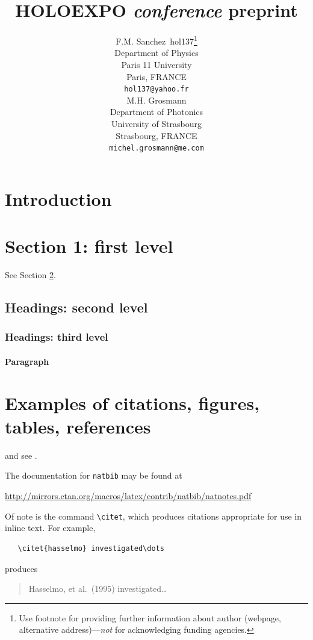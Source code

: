 \documentclass{article}
\title{HOLOEXPO \emph{conference} preprint}
\author{
  F.M. Sanchez~hol137\thanks{Use footnote for providing further
    information about author (webpage, alternative
    address)---\emph{not} for acknowledging funding agencies.} \\
  Department of Physics\\
  Paris 11 University\\
  Paris, FRANCE \\
  \texttt{hol137@yahoo.fr} \\
   \And
 M.H. Grosmann \\
  Department of Photonics\\
  University of Strasbourg\\
  Strasbourg, FRANCE \\
  \texttt{michel.grosmann@me.com} \\
}
\begin{document}
\maketitle

\begin{abstract}
\lipsum[1]
\end{abstract}




\section{Introduction}
\lipsum[2]
\lipsum[3]


\section{Section 1: first level}
\label{sec:headings}

\lipsum[4] See Section \ref{sec:headings}.

\subsection{Headings: second level}
\lipsum[5]

\subsubsection{Headings: third level}
\lipsum[6]

\paragraph{Paragraph}
\lipsum[7]

\section{Examples of citations, figures, tables, references}
\label{sec:others}
\lipsum[8] \cite{Sanchez3,Sanchez4} and see \cite{Grosmann}.

The documentation for \verb+natbib+ may be found at
\begin{center}
  \url{http://mirrors.ctan.org/macros/latex/contrib/natbib/natnotes.pdf}
\end{center}
Of note is the command \verb+\citet+, which produces citations
appropriate for use in inline text.  For example,
\begin{verbatim}
   \citet{hasselmo} investigated\dots
\end{verbatim}
produces
\begin{quote}
  Hasselmo, et al.\ (1995) investigated\dots
\end{quote}
\end{document}
